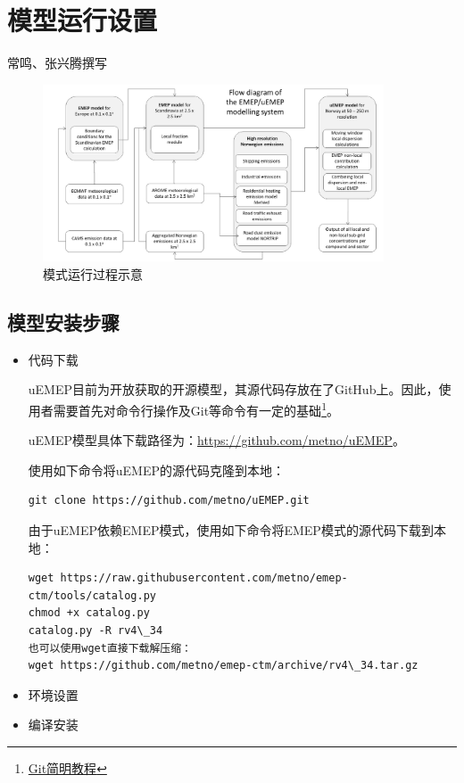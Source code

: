 \documentclass{article}
\begin{document}
\section{模型运行设置}

{\color{red} 常鸣、张兴腾撰写}

\begin{figure}[H]
\includegraphics[width=0.9\textwidth]{emepuemepflow.png}
\centering\caption{模式运行过程示意}\label{emepuemepflow}
\end{figure}

\subsection{模型安装步骤}

\begin{itemize}

\item 代码下载

uEMEP目前为开放获取的开源模型，其源代码存放在了GitHub上。因此，使用者需要首先对命令行操作及Git等命令有一定的基础\footnote{\href{https://www.liaoxuefeng.com/wiki/896043488029600}{Git简明教程}}。

uEMEP模型具体下载路径为：\url{https://github.com/metno/uEMEP}。

使用如下命令将uEMEP的源代码克隆到本地：

\begin{lstlisting}[language={[ANSI]C},keywordstyle=\color{blue!70},commentstyle=\color{red!50!green!50!blue!50},frame=shadowbox, rulesepcolor=\color{red!20!green!20!blue!20}]
git clone https://github.com/metno/uEMEP.git
\end{lstlisting}

由于uEMEP依赖EMEP模式，使用如下命令将EMEP模式的源代码下载到本地：

\begin{lstlisting}[language={[ANSI]C},keywordstyle=\color{blue!70},commentstyle=\color{red!50!green!50!blue!50},frame=shadowbox, rulesepcolor=\color{red!20!green!20!blue!20}]
wget https://raw.githubusercontent.com/metno/emep-ctm/tools/catalog.py
chmod +x catalog.py
catalog.py -R rv4\_34
也可以使用wget直接下载解压缩：
wget https://github.com/metno/emep-ctm/archive/rv4\_34.tar.gz
\end{lstlisting}

\item 环境设置

\item 编译安装

\end{itemize}
\end{document}

